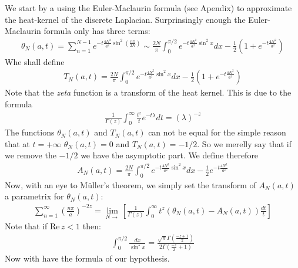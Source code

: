 \documentclass[12pt]{article}
\def\Re{\mathrm{Re}\,}
\begin{document}
We start by a using the Euler-Maclaurin formula (see Apendix) to approximate the heat-kernel of the discrete Laplacian. Surprinsingly enough the Euler-Maclaurin formula only has three terms:
\begin{gather}
\theta_N(a,t)=\sum_{n=1}^{N-1}e^{-t\frac{4N^2}{a^2}\sin^2\left(\frac{n\pi}{2N}\right)}\sim \frac{2N}{\pi}\int_0^{\pi/2}e^{-t\frac{4N^2}{a^2}\sin^2 x}dx-\frac{1}{2}\left(1+e^{-t\frac{4N^2}{a^2}}\right)
\end{gather}
Whe shall define
\begin{gather}
T_N(a,t)=\frac{2N}{\pi}\int_0^{\pi/2}e^{-t\frac{4N^2}{a^2}\sin^2 x}dx-\frac{1}{2}\left(1+e^{-t\frac{4N^2}{a^2}}\right)
\end{gather}
Note that the \textit{zeta} function is a transform of the heat kernel. This is due to the formula
\begin{gather}
\frac{1}{\Gamma(z)}\int_0^\infty\frac{t^z}{t}e^{-t\lambda}dt=(\lambda)^{-z}
\end{gather}
The functions $\theta_N(a,t)$ and $T_N(a,t)$ can not be equal for the simple reason that at $t=+\infty$ $\theta_N(a,t)=0$ and $T_N(a,t)=-1/2$. So we merelly say that if we remove the $-1/2$ we have the asymptotic part. We define therefore
\begin{gather}
A_N(a,t)=\frac{2N}{\pi}\int_0^{\pi/2}e^{-t\frac{4N^2}{a^2}\sin^2 x}dx-\frac{1}{2}e^{-t\frac{4N^2}{a^2}}
\end{gather}
Now, with an eye to Müller's theorem, we simply set the transform of $A_N(a,t)$ a parametrix for $\theta_N(a,t)$:
\begin{gather}
\sum_{n=1}^\infty\left(\frac{n\pi}{a}\right)^{-2z}=\lim_{N\rightarrow} \left[\frac{1}{\Gamma(z)}\int_0^\infty t^z(\theta_N(a,t)-A_N(a,t))\frac{dt}{t}\right]
\end{gather}
Note that if $\Re z<1$ then:
\begin{gather}
\int_0^{\pi/2}\frac{dx}{\sin^z x}=\frac{\sqrt{\pi}\Gamma\left(\frac{-z+1}{2}\right)}{2\Gamma\left(\frac{-z}{2}+1\right)}
\end{gather}
Now with have the formula of our hypothesis.
\end{document}
